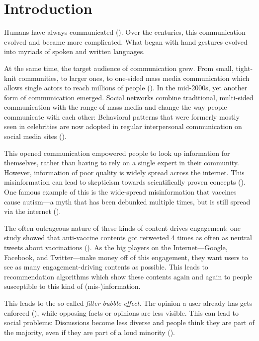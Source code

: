 \section{Introduction}
Humans have always communicated (\cite{tomasello2010origins}). Over the centuries, this communication evolved and became more complicated. What began with hand gestures evolved into myriads of spoken and written languages.

At the same time, the target audience of communication grew. From small, tight-knit communities, to larger ones, to one-sided mass media communication which allows single actors to reach millions of people (\cite{luhmann1995realitat}). In the mid-2000s, yet another form of communication emerged. Social networks combine traditional, multi-sided communication with the range of mass media and change the way people communicate with each other: Behavioral patterns that were formerly mostly seen in celebrities are now adopted in regular interpersonal communication on social media sites (\cite{stefanoneRelationshipTraditionalMass2010}).

This opened communication empowered people to look up information for themselves, rather than having to rely on a single expert in their community. However, information of poor quality is widely spread across the internet. This misinformation can lead to skepticism towards scientifically proven concepts (\cite{krimskyRiskCommunicationInternet2007}). One famous example of this is the wide-spread misinformation that vaccines cause autism---a myth that has been debunked multiple times, but is still spread via the internet (\cite{baker2008mercury}).

The often outrageous nature of these kinds of content drives engagement: one study showed that anti-vaccine contents got retweeted 4 times as often as neutral tweets about vaccinations (\cite{blankenshipSentimentContentsRetweets2018}). As the big players on the Internet---Google, Facebook, and Twitter---make money off of this engagement, they want users to see as many engagement-driving contents as possible. This leads to recommendation algorithms which show these contents again and again to people susceptible to this kind of (mis-)information.

This leads to the so-called \emph{filter bubble-effect}. The opinion a user already has gets enforced (\cite{pariser2011filter}), while opposing facts or opinions are less visible. This can lead to social problems: Discussions become less diverse and people think they are part of the majority, even if they are part of a loud minority (\cite{moscoviciSilentMajoritiesLoud1991}).

